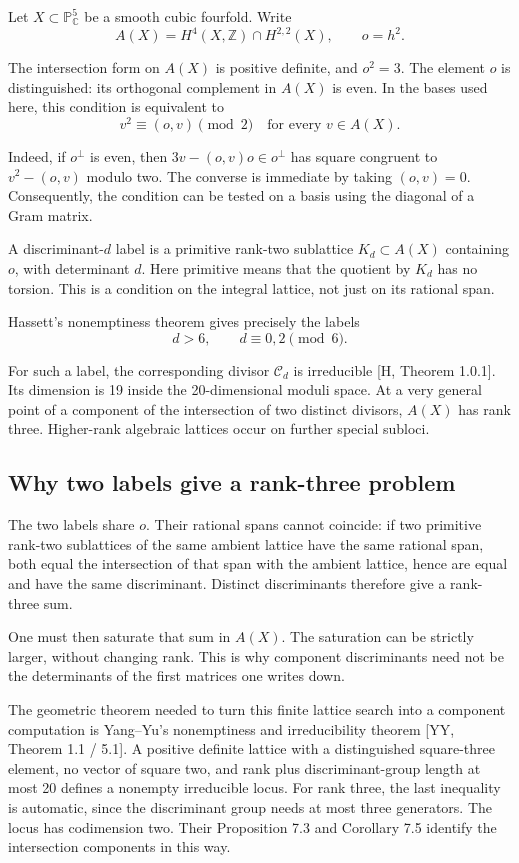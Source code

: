 \documentclass[
  american,
  11pt,
  a4paper,
]{article}
\begin{document}
Let \(X\subset\mathbb P^5_{\mathbb C}\) be a smooth cubic fourfold.
Write
\[A(X)=H^4(X,\mathbb Z)\cap H^{2,2}(X),\qquad o=h^2.\]

The intersection form on \(A(X)\) is positive definite, and \(o^2=3\).
The element \(o\) is distinguished: its orthogonal complement in
\(A(X)\) is even. In the bases used here, this condition is equivalent
to
\[v^2\equiv(o,v)\pmod2\quad\text{for every }v\in A(X).\]

Indeed, if \(o^\perp\) is even, then \(3v-(o,v)o\in o^\perp\) has square
congruent to \(v^2-(o,v)\) modulo two. The converse is immediate by
taking \((o,v)=0\). Consequently, the condition can be tested on a basis
using the diagonal of a Gram matrix.

A discriminant-\(d\) label is a primitive rank-two sublattice
\(K_d\subset A(X)\) containing \(o\), with determinant \(d\). Here
primitive means that the quotient by \(K_d\) has no torsion. This is a
condition on the integral lattice, not just on its rational span.

Hassett's nonemptiness theorem gives precisely the labels
\[d>6,\qquad d\equiv0,2\pmod6.\]

For such a label, the corresponding divisor \(\mathcal C_d\) is
irreducible {[}H, Theorem 1.0.1{]}. Its dimension is 19 inside the
20-dimensional moduli space. At a very general point of a component of
the intersection of two distinct divisors, \(A(X)\) has rank three.
Higher-rank algebraic lattices occur on further special subloci.

\subsection{Why two labels give a rank-three
problem}\label{why-two-labels-give-a-rank-three-problem}

The two labels share \(o\). Their rational spans cannot coincide: if two
primitive rank-two sublattices of the same ambient lattice have the same
rational span, both equal the intersection of that span with the ambient
lattice, hence are equal and have the same discriminant. Distinct
discriminants therefore give a rank-three sum.

One must then saturate that sum in \(A(X)\). The saturation can be
strictly larger, without changing rank. This is why component
discriminants need not be the determinants of the first matrices one
writes down.

The geometric theorem needed to turn this finite lattice search into a
component computation is Yang--Yu's nonemptiness and irreducibility
theorem {[}YY, Theorem 1.1 / 5.1{]}. A positive definite lattice with a
distinguished square-three element, no vector of square two, and rank
plus discriminant-group length at most 20 defines a nonempty irreducible
locus. For rank three, the last inequality is automatic, since the
discriminant group needs at most three generators. The locus has
codimension two. Their Proposition 7.3 and Corollary 7.5 identify the
intersection components in this way.
\end{document}
